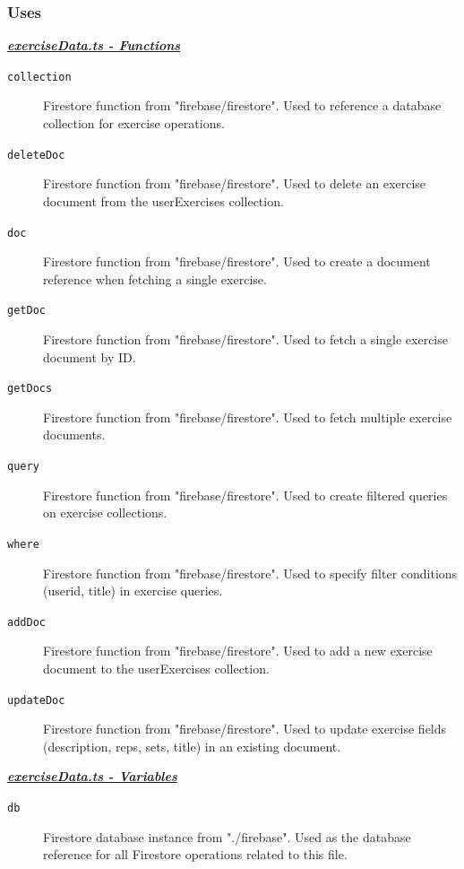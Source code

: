 \documentclass[12pt, titlepage]{article}
\begin{document}
\subsubsection{Uses}
\noindent \underline{\textbf{\textit{exerciseData.ts - Functions}}}
\begin{description}
\item[\texttt{collection}] 
    Firestore function from "firebase/firestore". Used to reference a database collection for exercise operations.

\item[\texttt{deleteDoc}] 
    Firestore function from "firebase/firestore". Used to delete an exercise document from the userExercises collection.

\item[\texttt{doc}] 
    Firestore function from "firebase/firestore". Used to create a document reference when fetching a single exercise.

\item[\texttt{getDoc}] 
    Firestore function from "firebase/firestore". Used to fetch a single exercise document by ID.

\item[\texttt{getDocs}] 
    Firestore function from "firebase/firestore". Used to fetch multiple exercise documents.

\item[\texttt{query}] 
    Firestore function from "firebase/firestore". Used to create filtered queries on exercise collections.

\item[\texttt{where}] 
    Firestore function from "firebase/firestore". Used to specify filter conditions (userid, title) in exercise queries.

\item[\texttt{addDoc}] 
    Firestore function from "firebase/firestore". Used to add a new exercise document to the userExercises collection.

\item[\texttt{updateDoc}] 
    Firestore function from "firebase/firestore". Used to update exercise fields (description, reps, sets, title) in an existing document.
\end{description}

\noindent \underline{\textbf{\textit{exerciseData.ts - Variables}}}
\begin{description}
\item[\texttt{db}] 
    Firestore database instance from "./firebase". Used as the database reference for all Firestore operations related to this file.
\end{description}
\end{document}
